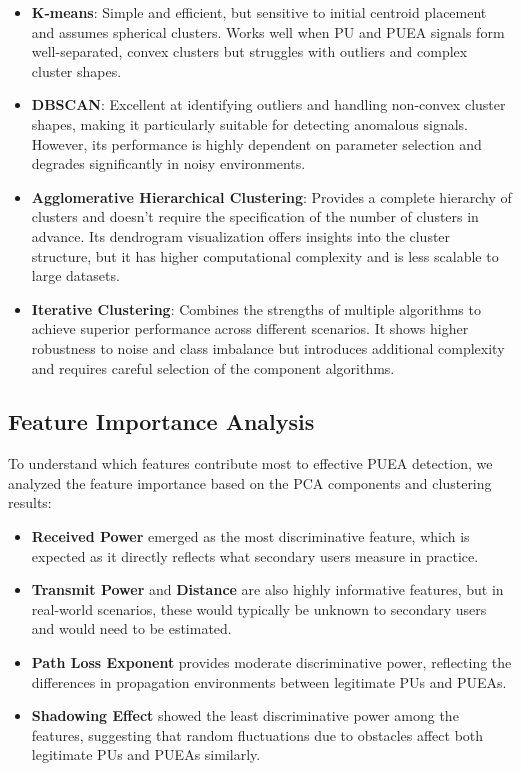 \begin{itemize}
    \item \textbf{K-means}: Simple and efficient, but sensitive to initial centroid placement and assumes spherical clusters. Works well when PU and PUEA signals form well-separated, convex clusters but struggles with outliers and complex cluster shapes.
    
    \item \textbf{DBSCAN}: Excellent at identifying outliers and handling non-convex cluster shapes, making it particularly suitable for detecting anomalous signals. However, its performance is highly dependent on parameter selection and degrades significantly in noisy environments.
    
    \item \textbf{Agglomerative Hierarchical Clustering}: Provides a complete hierarchy of clusters and doesn't require the specification of the number of clusters in advance. Its dendrogram visualization offers insights into the cluster structure, but it has higher computational complexity and is less scalable to large datasets.
    
    \item \textbf{Iterative Clustering}: Combines the strengths of multiple algorithms to achieve superior performance across different scenarios. It shows higher robustness to noise and class imbalance but introduces additional complexity and requires careful selection of the component algorithms.
\end{itemize}

\subsection{Feature Importance Analysis}
To understand which features contribute most to effective PUEA detection, we analyzed the feature importance based on the PCA components and clustering results:

\begin{itemize}
    \item \textbf{Received Power} emerged as the most discriminative feature, which is expected as it directly reflects what secondary users measure in practice.
    
    \item \textbf{Transmit Power} and \textbf{Distance} are also highly informative features, but in real-world scenarios, these would typically be unknown to secondary users and would need to be estimated.
    
    \item \textbf{Path Loss Exponent} provides moderate discriminative power, reflecting the differences in propagation environments between legitimate PUs and PUEAs.
    
    \item \textbf{Shadowing Effect} showed the least discriminative power among the features, suggesting that random fluctuations due to obstacles affect both legitimate PUs and PUEAs similarly.
\end{itemize}


